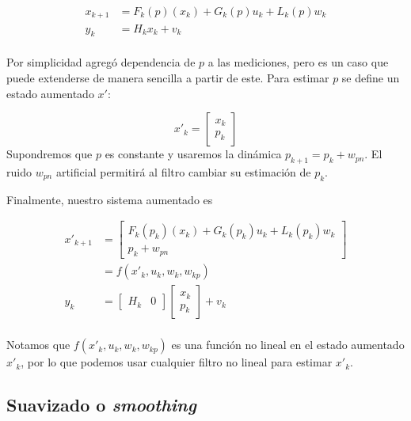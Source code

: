 \[
\begin{aligned}
x_{k+1} &= F_k(p)(x_k) + G_k(p)u_k + L_k(p)w_k \\
y_{k} &= H_k x_k + v_k \\ 
\end{aligned}
\]

Por simplicidad agregó dependencia de \(p\) a las mediciones, pero es un caso que puede extenderse de manera sencilla a partir de este. Para estimar \(p\) se define un estado aumentado \(x'\):

\[
x'_k = \begin{bmatrix}x_k \\ p_k \end{bmatrix}
\]
Supondremos que \(p\) es constante y usaremos la dinámica \(p_{k+1} = p_k + w_{pn}\). El ruido \(w_{pn}\) artificial permitirá al filtro cambiar su estimación de \(p_k\). 

Finalmente, nuestro sistema aumentado es 

\[
\begin{aligned}
x'_{k+1} &= \begin{bmatrix} F_k(p_k)(x_k) + G_k(p_k)u_k + L_k(p_k)w_k \\ p_k + w_{pn} \end{bmatrix} \\
&= f(x'_{k}, u_k, w_k, w_{kp}) \\
y_{k} &= \begin{bmatrix} H_k & 0 \end{bmatrix} \begin{bmatrix}x_k \\ p_k \end{bmatrix} + v_k \\ 
\end{aligned}
\]

Notamos que \(f(x'_{k}, u_k, w_k, w_{kp}) \) es una función no lineal en el estado aumentado \(x'_k\), por lo que podemos usar cualquier filtro no lineal para estimar \(x'_k\).\\


\subsection{Suavizado o \textit{smoothing} } \label{smoother}


